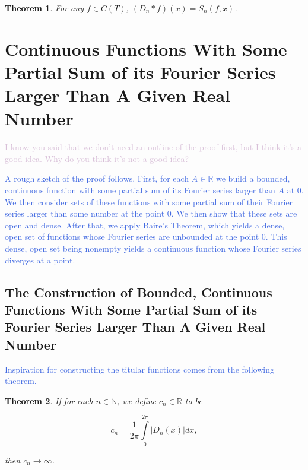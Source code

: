 \documentclass{amsart}
\newcommand{\N}{\mathbb{N}}
\newcommand{\R}{\mathbb{R}}
\newcommand{\colorcomment}[2]{\textcolor{#1}{#2}} %
\newcommand{\absval}[1]{\lvert #1 \rvert}
\newtheorem{thm}{Theorem}[section]
\theoremstyle{definition}
\begin{document}
\begin{thm}
For any $f \in C(T)$, $(D_n \ast f)(x) = S_n(f,x)$. 
\end{thm}

\section{Continuous Functions With Some Partial Sum of its Fourier Series Larger Than A Given Real Number}

\colorcomment{Thistle}{I know you said that we don't need an outline of the proof first, but I think it's a good idea. Why do you think it's not a good idea?}

\colorcomment{RoyalBlue}{A rough sketch of the proof follows. 
First, for each $A \in \R$ we build a bounded, continuous function with some partial sum of its Fourier series larger than $A$ at $0$. 
We then consider sets of these functions with some partial sum of their Fourier series larger than some number at the point $0$.
We then show that these sets are open and dense. 
After that, we apply Baire's Theorem, which yields a dense, open set of functions whose Fourier series are unbounded at the point $0$. 
This dense, open set being nonempty yields a continuous function whose Fourier series diverges at a point.}

\subsection{The Construction of Bounded, Continuous Functions With Some Partial Sum of its Fourier Series Larger Than A Given Real Number}

\colorcomment{RoyalBlue}{Inspiration for constructing the titular functions comes from the following theorem.}

\begin{thm}
If for each $n \in \N$, we define $c_n \in \R$ to be

\begin{displaymath}
c_n = \frac{1}{2 \pi} \int\limits_0^{2\pi} \absval{D_n(x)} dx,
\end{displaymath}

then $c_n \to \infty$.
\end{thm}
\end{document}
